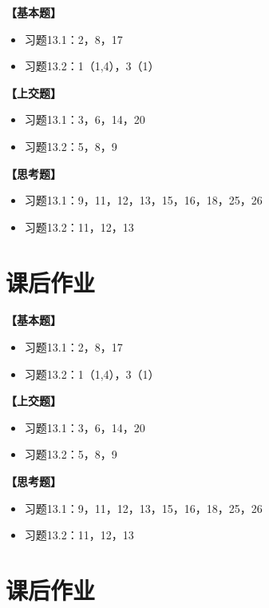 {\bf 【基本题】}

\begin{itemize}
  \setlength{\itemindent}{1cm}
  \item 习题13.1：2，8，17
  \item 习题13.2：1（1,4），3（1）
\end{itemize}

{\bf 【上交题】}

\begin{itemize}
  \setlength{\itemindent}{1cm}
  \item 习题13.1：3，6，14，20
  \item 习题13.2：5，8，9
\end{itemize}

{\bf 【思考题】}

\begin{itemize}
  \setlength{\itemindent}{1cm}
  \item 习题13.1：9，11，12，13，15，16，18，25，26
  \item 习题13.2：11，12，13
\end{itemize}

\section*{课后作业}

{\bf 【基本题】}

\begin{itemize}
  \setlength{\itemindent}{1cm}
  \item 习题13.1：2，8，17
  \item 习题13.2：1（1,4），3（1）
\end{itemize}

{\bf 【上交题】}

\begin{itemize}
  \setlength{\itemindent}{1cm}
  \item 习题13.1：3，6，14，20
  \item 习题13.2：5，8，9
\end{itemize}

{\bf 【思考题】}

\begin{itemize}
  \setlength{\itemindent}{1cm}
  \item 习题13.1：9，11，12，13，15，16，18，25，26
  \item 习题13.2：11，12，13
\end{itemize}

\section*{课后作业}


